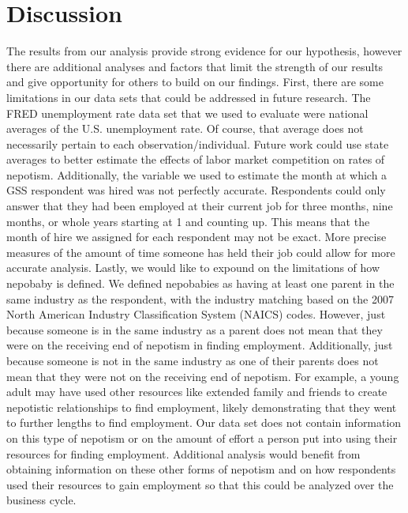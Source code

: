 \documentclass[12pt]{article}
\begin{document}
\section{Discussion}
\label{sec:discussion}
The results from our analysis provide strong evidence for our hypothesis, however there are additional analyses and factors that limit the strength of our results and give opportunity for others to build on our findings. First, there are some limitations in our data 
sets that could be addressed in future research. The FRED unemployment rate data set that we used to evaluate were national averages of the U.S. unemployment rate. Of course, that average does not necessarily pertain to each observation/individual. Future work could use state averages to better estimate the effects of labor market competition on rates of nepotism. Additionally, the variable we used to estimate the month at which a GSS respondent was hired was not perfectly accurate. Respondents could only answer that they had been employed at their current job for three months, nine months, or whole years starting at 1 and counting up. This means that the month of hire we assigned for each respondent may not be exact. More precise measures of the amount of time someone has held their job could allow for more accurate analysis. Lastly, we would like to expound on the limitations of how nepobaby is defined. We defined nepobabies as having at least one parent in the same industry as the respondent, with the industry matching based on the 2007 North American Industry Classification System (NAICS) codes. However, just because someone is in the same industry as a parent does not mean that they were on the receiving end of nepotism in finding employment. Additionally, just because someone is not in the same industry as one of their parents does not mean that they were not on the receiving end of nepotism. For example, a young adult may have used other resources like extended family and friends to create nepotistic relationships to find employment, likely demonstrating that they went to further lengths to find employment. Our data set does not contain information on this type of nepotism or on the amount of effort a person put into using their resources for finding employment. Additional analysis would benefit from obtaining information on these other forms of nepotism and on how respondents used their resources to gain employment so that this could be analyzed over the business cycle.
\end{document}

